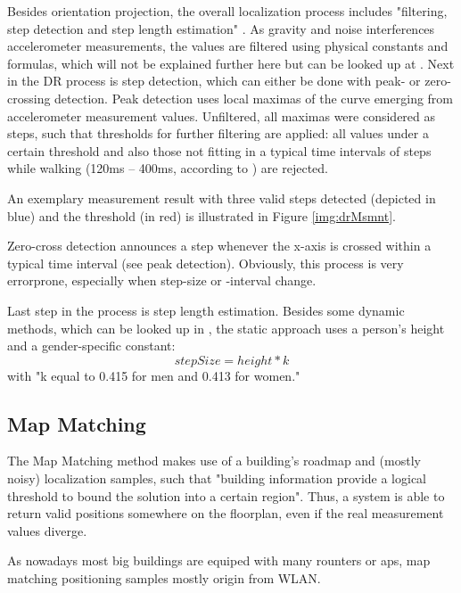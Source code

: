 Besides orientation projection, the overall localization process includes "filtering, step detection and step length estimation" \cite{drSystem}. As gravity and noise interferences accelerometer measurements, the values are filtered using physical constants and formulas, which will not be explained further here but can be looked up at \cite[p.3]{drSystem}.
Next in the DR process is step detection, which can either be done with peak- or zero-crossing detection. Peak detection uses local maximas of the curve emerging from accelerometer measurement values. Unfiltered, all maximas were considered as steps, such that thresholds for further filtering are applied: all values under a certain threshold and also those not fitting in a typical time intervals of steps while walking (120ms – 400ms, according to \cite{drSystem}) are rejected.

An exemplary measurement result with three valid steps detected (depicted in blue) and the threshold (in red) is illustrated in Figure \ref{img:drMsmnt}.

Zero-cross detection announces a step whenever the x-axis is crossed within a typical time interval (see peak detection). Obviously, this process is very errorprone, especially when step-size or -interval change.

Last step in the process is step length estimation. Besides some dynamic methods, which can be looked up in \cite{drSystem}, the static approach uses a person's height and a gender-specific constant: \[stepSize = height * k\] with "k equal to 0.415 for men and 0.413 for women." \cite{drSystem}

\subsection{Map Matching}

The Map Matching method makes use of a building's roadmap and (mostly noisy) localization samples, such that "building information provide a logical threshold to bound the solution into a certain region"\cite{mmSystem}. Thus, a system is able to return valid positions somewhere on the floorplan, even if the real measurement values diverge.

As nowadays most big buildings are equiped with many rounters or \ac{ap}s, map matching positioning samples mostly origin from WLAN.

